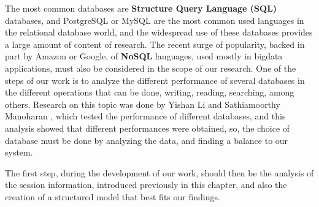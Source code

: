 \par The most common databases are \textbf{Structure Query Language (SQL)} databases, and PostgreSQL or MySQL are the most common used languages in the relational database world, and the widespread use of these databases provides a large amount of content of research. The recent surge of popularity, backed in part by Amazon or Google, of \textbf{NoSQL} languages, used mostly in bigdata applications, must also be considered in the scope of our research. One of the steps of our work is to analyze the different performance of several databases in the different operations that can be done, writing, reading, searching, among others. Research on this topic was done by Yishan Li and Sathiamoorthy Manoharan \cite{li_performance_2013}, which tested the performance of different databases, and this analysis showed that different performances were obtained, so, the choice of database must be done by analyzing the data, and finding a balance to our system.

\par The first step, during the development of our work, should then be the analysis of the session information, introduced previously in this chapter, and also the creation of a structured model that best fits our findings. 

